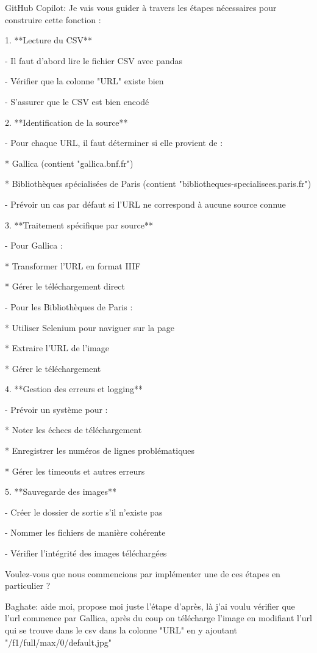 GitHub Copilot: Je vais vous guider à travers les étapes nécessaires pour construire cette fonction :

1. **Lecture du CSV**

- Il faut d'abord lire le fichier CSV avec pandas

- Vérifier que la colonne "URL" existe bien

- S'assurer que le CSV est bien encodé

2. **Identification de la source**

- Pour chaque URL, il faut déterminer si elle provient de :

* Gallica (contient "gallica.bnf.fr")

* Bibliothèques spécialisées de Paris (contient "bibliotheques-specialisees.paris.fr")

- Prévoir un cas par défaut si l'URL ne correspond à aucune source connue

3. **Traitement spécifique par source**

- Pour Gallica :

* Transformer l'URL en format IIIF

* Gérer le téléchargement direct

- Pour les Bibliothèques de Paris :

* Utiliser Selenium pour naviguer sur la page

* Extraire l'URL de l'image

* Gérer le téléchargement

4. **Gestion des erreurs et logging**

- Prévoir un système pour :

* Noter les échecs de téléchargement

* Enregistrer les numéros de lignes problématiques

* Gérer les timeouts et autres erreurs

5. **Sauvegarde des images**

- Créer le dossier de sortie s'il n'existe pas

- Nommer les fichiers de manière cohérente

- Vérifier l'intégrité des images téléchargées

Voulez-vous que nous commencions par implémenter une de ces étapes en particulier ?

Baghate: aide moi, propose moi juste l'étape d'après, là j'ai voulu vérifier que l'url commence par Gallica, après du coup on télécharge l'image en modifiant l'url qui se trouve dans le csv dans la colonne "URL" en y ajoutant "/f1/full/max/0/default.jpg"

